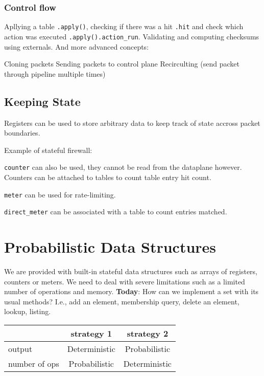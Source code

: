\documentclass[a4paper, fontsize=8pt, landscape, DIV=1]{scrartcl}
\begin{document}
\begin{multicols*}{4}
  \subsubsection{Control flow}
  Apllying a table \texttt{.apply()}, checking if there was a hit \texttt{.hit} and check which action was executed \texttt{.apply().action\_run}. Validating and computing checksums
  using externals. And more advanced concepts:
  \begin{outline}
   \1 Cloning packets
   \1 Sending packets to control plane
   \1 Recirculting (send packet through pipeline multiple times)
  \end{outline}

  \subsection{Keeping State}
  Registers can be used to store arbitrary data to keep track of state accross
  packet boundaries.

  Example of stateful firewall:

  \texttt{counter} can also be used, they cannot be read from the dataplane however.
  Counters can be attached to tables to count table entry hit count.

  \texttt{meter} can be used for rate-limiting. 

  \texttt{direct\_meter} can be associated with a table to count entries matched.



  \section{Probabilistic Data Structures}
  We are provided with built-in stateful data structures such as arrays of registers, 
  counters or meters. We need to deal with severe limitations such as a limited
  number of operations and memory. \textbf{Today}: How can we implement a set with
  its usual methods? I.e., add an element, membership query, delete an element,
  lookup, listing.

  \begin{center}
  \begin{tabular}{l | c | c }
    {} & strategy 1 & strategy 2 \\ \hline
    output & Deterministic & Probabilistic \\
    number of ops & Probabilistic & Deterministic
  \end{tabular}
  \end{center}


\end{multicols*}
\end{document}
